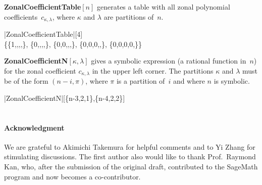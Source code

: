 \documentclass{mathincs}
\numberwithin{equation}{section}
\numberwithin{figure}{section}
\theoremstyle{plain}
\theoremstyle{definition}
\theoremstyle{remark}
\theoremstyle{plain}
\theoremstyle{definition}
\theoremstyle{plain}
\theoremstyle{plain}
\begin{document}
\noindent\textbf{ZonalCoefficientTable}$[n]$
generates a table with all zonal polynomial coefficients~$c_{\kappa,\lambda}$,
where $\kappa$ and $\lambda$ are partitions of~$n$.
\begin{mma}
  \In |ZonalCoefficientTable|[4] \\ %
  \Out \Bigl\{\Bigl\{1,,,,\Bigr\},
    \Bigl\{0,,,,\Bigr\},
    \Bigl\{0,0,,,\Bigr\},
    \Bigl\{0,0,0,,\Bigr\},
    \Bigl\{0,0,0,0,\Bigr\}\Bigr\} \kern-8pt \\
\end{mma}
\bigskip

\noindent\textbf{ZonalCoefficientN}$[\kappa, \lambda]$
gives a symbolic expression (a rational function in~$n$) for the
zonal coefficient $c_{\kappa,\lambda}$ in the upper left corner.
The partitions $\kappa$ and $\lambda$ must be of the form $(n-i,\pi)$,
where $\pi$ is a partition of~$i$ and where $n$ is symbolic.
\begin{mma}
  \In |ZonalCoefficientN|[\{n-3,2,1\},\{n-4,2,2\}] \\
  \Out {} \\
\end{mma}
\bigskip

\paragraph*{Acknowledgment}
We are grateful to Akimichi Takemura for helpful comments and to Yi Zhang for
stimulating discussions.
The first author also would like to thank Prof.~Raymond Kan, who, after the
submission of the original draft, contributed to the SageMath program and now
becomes a co-contributor.





\end{document}
